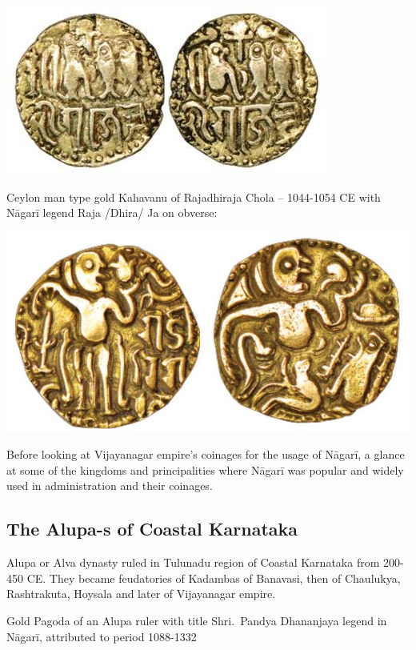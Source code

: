 \centerline{\includegraphics[scale=0.45]{"images/article-06/art06-fig13.jpg"}}

Ceylon man type gold Kahavanu of Rajadhiraja Chola – 1044-1054 CE with Nāgarī legend Raja /Dhira/ Ja on obverse:

\centerline{\includegraphics[scale=0.45]{"images/article-06/art06-fig14.jpg"}}

Before looking at Vijayanagar empire’s coinages for the usage of Nāgarī, a glance at some of the kingdoms and principalities where Nāgarī was popular and widely used in administration and their coinages.


\subsection*{The Alupa-s of Coastal Karnataka}

Alupa or Alva dynasty ruled in Tulunadu region of Coastal Karnataka from 200-450 CE. They became feudatories of Kadambas of Banavasi, then of Chaulukya, Rashtrakuta, Hoysala and later of Vijayanagar empire.

Gold Pagoda of an Alupa ruler with title Shri.\ Pandya Dhananjaya legend in Nāgarī, attributed to period 1088-1332


